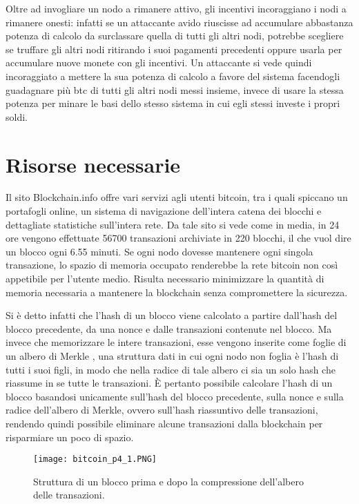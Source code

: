 Oltre ad invogliare un nodo a rimanere attivo, gli incentivi incoraggiano i nodi a rimanere onesti: infatti se un attaccante avido riuscisse ad accumulare abbastanza potenza di calcolo da surclassare quella di tutti gli altri nodi, potrebbe scegliere se truffare gli altri nodi ritirando i suoi pagamenti precedenti oppure usarla per accumulare nuove monete con gli incentivi. Un attaccante si vede quindi incoraggiato a mettere la sua potenza di calcolo a favore del sistema facendogli guadagnare più btc di tutti gli altri nodi messi insieme, invece di usare la stessa potenza per minare le basi dello stesso sistema in cui egli stessi investe i propri soldi.

\section{Risorse necessarie}\label{risorse-necessarie}

Il sito Blockchain.info \cite{blockchain-info} offre vari servizi agli utenti bitcoin, tra i quali spiccano un portafogli online, un sistema di navigazione dell'intera catena dei blocchi e dettagliate statistiche sull'intera rete. Da tale sito si vede come in media, in 24 ore vengono effettuate 56700 transazioni archiviate in 220 blocchi, il che vuol dire un blocco ogni 6.55 minuti. Se ogni nodo dovesse mantenere ogni singola transazione, lo spazio di memoria occupato renderebbe la rete bitcoin non così appetibile per l'utente medio. Risulta necessario minimizzare la quantità di memoria necessaria a mantenere la blockchain senza compromettere la sicurezza.

Si è detto infatti che l'hash di un blocco viene calcolato a partire dall'hash del blocco precedente, da una nonce e dalle transazioni contenute nel blocco. Ma invece che memorizzare le intere transazioni, esse vengono inserite come foglie di un albero di Merkle \cite{merkle}, una struttura dati in cui ogni nodo non foglia è l'hash di tutti i suoi figli, in modo che nella radice di tale albero ci sia un solo hash che riassume in se tutte le transazioni. È pertanto possibile calcolare l'hash di un blocco basandosi unicamente sull'hash del blocco precedente, sulla nonce e sulla radice dell'albero di Merkle, ovvero sull'hash riassuntivo delle transazioni, rendendo quindi possibile eliminare alcune transazioni dalla blockchain per risparmiare un poco di spazio.

\begin{figure}[htbp]
\centering
\texttt{[image: bitcoin\_p4\_1.PNG]}
\caption{Struttura di un blocco prima e dopo la compressione dell'albero delle transazioni.\label{bitcoin_p4_1}}
\end{figure}

